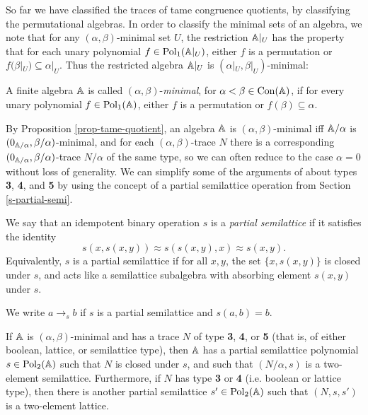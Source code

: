 \begin{appendices}
So far we have classified the traces of tame congruence quotients, by classifying the permutational algebras. In order to classify the minimal sets of an algebra, we note that for any $(\alpha,\beta)$-minimal set $U$, the restriction $\mathbb{A}|_U$ has the property that for each unary polynomial $f \in \operatorname{Pol}_1(\mathbb{A}|_U)$, either $f$ is a permutation or $f(\beta|_U) \subseteq \alpha|_U$. Thus the restricted algebra $\mathbb{A}|_U$ is $(\alpha|_U,\beta|_U)$-minimal:

\begin{defn} A finite algebra $\mathbb{A}$ is called $(\alpha,\beta)$-\emph{minimal}, for $\alpha < \beta \in \operatorname{Con}(\mathbb{A})$, if for every unary polynomial $f \in \operatorname{Pol}_1(\mathbb{A})$, either $f$ is a permutation or $f(\beta) \subseteq \alpha$.
\end{defn}

By Proposition \ref{prop-tame-quotient}, an algebra $\mathbb{A}$ is $(\alpha,\beta)$-minimal iff $\mathbb{A}/\alpha$ is $(0_{\mathbb{A}/\alpha}, \beta/\alpha)$-minimal, and for each $(\alpha,\beta)$-trace $N$ there is a corresponding $(0_{\mathbb{A}/\alpha},\beta/\alpha)$-trace $N/\alpha$ of the same type, so we can often reduce to the case $\alpha = 0$ without loss of generality. We can simplify some of the arguments of \cite{hobby-mckenzie} about types \textbf{3}, \textbf{4}, and \textbf{5} by using the concept of a partial semilattice operation from Section \ref{s-partial-semi}.

\begin{defn} We say that an idempotent binary operation $s$ is a \emph{partial semilattice} if it satisfies the identity
\[
s(x,s(x,y)) \approx s(s(x,y),x) \approx s(x,y).
\]
Equivalently, $s$ is a partial semilattice if for all $x,y$, the set $\{x,s(x,y)\}$ is closed under $s$, and acts like a semilattice subalgebra with absorbing element $s(x,y)$ under $s$.

We write $a \rightarrow_s b$ if $s$ is a partial semilattice and $s(a,b) = b$.
\end{defn}

\begin{prop}\label{prop-tame-partial-semi} If $\mathbb{A}$ is $(\alpha,\beta)$-minimal and has a trace $N$ of type \textbf{3}, \textbf{4}, or \textbf{5} (that is, of either boolean, lattice, or semilattice type), then $\mathbb{A}$ has a partial semilattice polynomial $s \in \operatorname{Pol}_2(\mathbb{A})$ such that $N$ is closed under $s$, and such that $(N/\alpha, s)$ is a two-element semilattice. Furthermore, if $N$ has type  \textbf{3} or \textbf{4} (i.e. boolean or lattice type), then there is another partial semilattice $s' \in \operatorname{Pol}_2(\mathbb{A})$ such that $(N, s, s')$ is a two-element lattice.


\end{prop}
\end{appendices}
